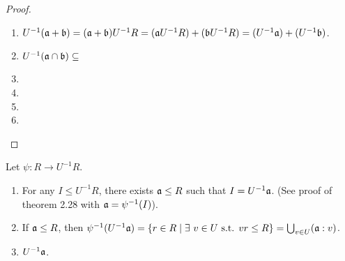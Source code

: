 \begin{proof}
    \begin{enumerate}
        \item $U^{-1}(\mathfrak{a}+\mathfrak{b}) = (\mathfrak{a}+\mathfrak{b})U^{-1}R = (\mathfrak{a} U^{-1}R) + (\mathfrak{b} U^{-1}R) = (U^{-1}\mathfrak{a}) + (U^{-1}\mathfrak{b})$.
        \item $U^{-1}(\mathfrak{a} \cap \mathfrak{b}) \subseteq$
        \item 
        \item 
        \item 
        \item 
    \end{enumerate}
\end{proof}

\begin{proposition}
    Let $\psi: R \to U^{-1}R$.
    \begin{enumerate}
        \item For any $I \leq U^{-1}R$, there exists $\mathfrak{a} \leq R$ such that $I = U^{-1}\mathfrak{a}$. (See proof of theorem 2.28 with $\mathfrak{a} = \psi^{-1}(I)$).
        \item If $\mathfrak{a} \leq R$, then $\psi^{-1}(U^{-1}\mathfrak{a}) =\{r \in R \mid \exists \  v \in U \text{ s.t. }v r \leq R\} = \bigcup_{v \in U} (\mathfrak{a}:v)$.
        \item $U^{-1}\mathfrak{a}$.
    \end{enumerate}
\end{proposition}

\begin{proposition}
\end{proposition}


